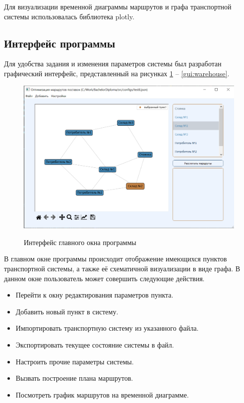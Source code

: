 Для визуализации временной диаграммы маршрутов и графа транспортной системы использовалась библиотека plotly\cite{libs:plotly}.

\subsection{Интерфейс программы}
Для удобства задания и изменения параметров системы был разработан графический интерфейс, представленный на рисунках \ref{gui:main} -- \ref{gui:warehouse}.

\begin{figure}[hp]
	\begin{center}
		{\includegraphics[scale=0.75, angle=0, page=1]{img/main_page.png}}
		\caption{Интерфейс главного окна программы}
		\label{gui:main}
	\end{center}
\end{figure}

В главном окне программы происходит отображение имеющихся пунктов транспортной системы, а также её схематичной визуализации в виде графа. В данном окне пользователь может совершить следующие действия.

\begin{itemize}
	\item Перейти к окну редактирования параметров пункта.
	\item Добавить новый пункт в систему.
	\item Импортировать транспортную систему из указанного файла.
	\item Экспортировать текущее состояние системы в файл.
	\item Настроить прочие параметры системы.
	\item Вызвать построение плана маршрутов.
	\item Посмотреть график маршрутов на временной диаграмме.
\end{itemize}

